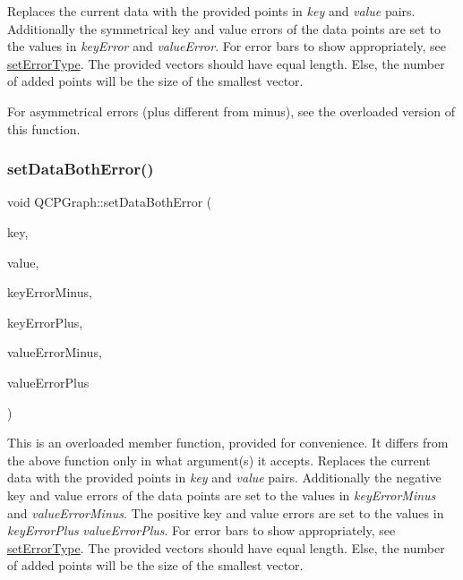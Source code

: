 Replaces the current data with the provided points in {\itshape key} and {\itshape value} pairs. Additionally the symmetrical key and value errors of the data points are set to the values in {\itshape key\+Error} and {\itshape value\+Error}. For error bars to show appropriately, see \hyperlink{class_q_c_p_graph_ac3614d799c3894f2bc646e99c7f73d38}{set\+Error\+Type}. The provided vectors should have equal length. Else, the number of added points will be the size of the smallest vector.

For asymmetrical errors (plus different from minus), see the overloaded version of this function. \hypertarget{class_q_c_p_graph_abb75736ecdbf6e6a7501e1da64fb18cf}{}\label{class_q_c_p_graph_abb75736ecdbf6e6a7501e1da64fb18cf} 
\subsubsection{\texorpdfstring{set\+Data\+Both\+Error()}{setDataBothError()}\hspace{0.1cm}{\footnotesize\ttfamily [2/2]}}
{\footnotesize\ttfamily void Q\+C\+P\+Graph\+::set\+Data\+Both\+Error (\begin{DoxyParamCaption}\item[{const Q\+Vector$<$ double $>$ \&}]{key,  }\item[{const Q\+Vector$<$ double $>$ \&}]{value,  }\item[{const Q\+Vector$<$ double $>$ \&}]{key\+Error\+Minus,  }\item[{const Q\+Vector$<$ double $>$ \&}]{key\+Error\+Plus,  }\item[{const Q\+Vector$<$ double $>$ \&}]{value\+Error\+Minus,  }\item[{const Q\+Vector$<$ double $>$ \&}]{value\+Error\+Plus }\end{DoxyParamCaption})}

This is an overloaded member function, provided for convenience. It differs from the above function only in what argument(s) it accepts. Replaces the current data with the provided points in {\itshape key} and {\itshape value} pairs. Additionally the negative key and value errors of the data points are set to the values in {\itshape key\+Error\+Minus} and {\itshape value\+Error\+Minus}. The positive key and value errors are set to the values in {\itshape key\+Error\+Plus} {\itshape value\+Error\+Plus}. For error bars to show appropriately, see \hyperlink{class_q_c_p_graph_ac3614d799c3894f2bc646e99c7f73d38}{set\+Error\+Type}. The provided vectors should have equal length. Else, the number of added points will be the size of the smallest vector. \hypertarget{class_q_c_p_graph_abce9f07c0d722bc3e4fa7bd73c7e5dfa}{}\label{class_q_c_p_graph_abce9f07c0d722bc3e4fa7bd73c7e5dfa} 
